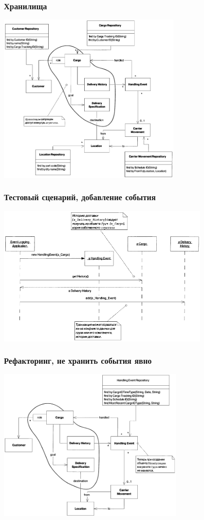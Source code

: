 \documentclass{../../slides-style}
\begin{document}
	\begin{frame}
		\frametitle{Хранилища}
		\begin{center}
			\includegraphics[width=0.69\textwidth]{cargoRepositories.png}
		\end{center}
	\end{frame}

	\begin{frame}
		\frametitle{Тестовый сценарий, добавление события}
		\begin{center}
			\includegraphics[width=0.8\textwidth]{cargoAddEvent.png}
		\end{center}
	\end{frame}

	\begin{frame}
		\frametitle{Рефакторинг, не хранить события явно}
		\begin{center}
			\includegraphics[width=0.7\textwidth]{cargoRefactored.png}
		\end{center}
	\end{frame}
\end{document}
